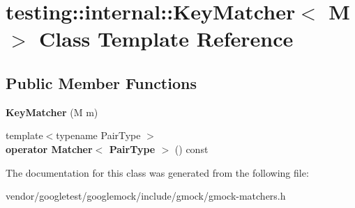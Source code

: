 \hypertarget{classtesting_1_1internal_1_1_key_matcher}{}\section{testing\+:\+:internal\+:\+:Key\+Matcher$<$ M $>$ Class Template Reference}
\label{classtesting_1_1internal_1_1_key_matcher}
\subsection*{Public Member Functions}
\begin{DoxyCompactItemize}
\item 
\mbox{\label{classtesting_1_1internal_1_1_key_matcher_a08429692150bf9304b493192abcf16d4}} 
{\bfseries Key\+Matcher} (M m)
\item 
\mbox{\label{classtesting_1_1internal_1_1_key_matcher_aa3861b06dd9e3255a7c1c013ddf88fb5}} 
{\footnotesize template$<$typename Pair\+Type $>$ }\\{\bfseries operator Matcher$<$ Pair\+Type $>$} () const
\end{DoxyCompactItemize}


The documentation for this class was generated from the following file\+:\begin{DoxyCompactItemize}
\item 
vendor/googletest/googlemock/include/gmock/gmock-\/matchers.\+h\end{DoxyCompactItemize}
